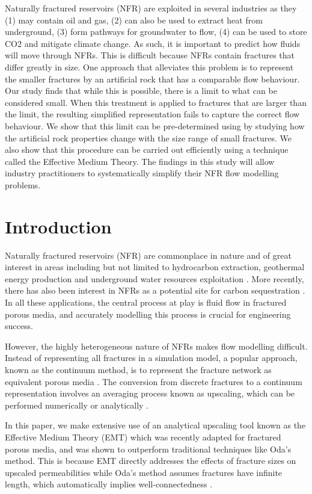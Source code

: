 \documentclass[a4paper]{article}
\begin{document}
Naturally fractured reservoirs (NFR) are exploited in several industries as they (1) may contain oil and gas, (2) can also be used to extract heat from underground, (3) form pathways for groundwater to flow, (4) can be used to store CO2 and mitigate climate change. As such, it is important to predict how fluids will move through NFRs. This is difficult because NFRs contain fractures that differ greatly in size. One approach that alleviates this problem is to represent the smaller fractures by an artificial rock that has a comparable flow behaviour. Our study finds that while this is possible, there is a limit to what can be considered small. When this treatment is applied to fractures that are larger than the limit, the resulting simplified representation fails to capture the correct flow behaviour. We show that this limit can be pre-determined using by studying how the artificial rock properties change with the size range of small fractures. We also show that this procedure can be carried out efficiently using a technique called the Effective Medium Theory. The findings in this study will allow industry practitioners to systematically simplify their NFR flow modelling problems.

\newpage
\section{Introduction}
Naturally fractured reservoirs (NFR) are commonplace in nature and of great interest in areas including but not limited to hydrocarbon extraction, geothermal energy production and underground water resources exploitation \citep{Berkowitz2002}. More recently, there has also been 
interest in NFRs as a potential site for carbon sequestration \citep{March2018}. In all these applications, the central process at play is fluid flow in fractured porous media, and accurately modelling this process is crucial for engineering success.

However, the highly heterogeneous nature of NFRs makes flow modelling difficult. Instead of representing all fractures in a simulation model, a popular approach, known as the continuum method, is to represent the fracture network as equivalent porous media \citep{Ezulike2013, Lemonnier2010a, Lemonnier2010, Warren1963, Yan2016}. The conversion from discrete fractures to a continuum representation involves an averaging process known as upscaling, which can be performed numerically or analytically \citep{Durlofsky1991,Oda1985,Renard1997,Saevik2013}. 

In this paper, we make extensive use of an analytical upscaling tool known as the Effective Medium Theory (EMT) which was recently adapted for fractured porous media, and was shown to outperform traditional techniques like Oda's method. This is because EMT directly addresses the effects of fracture sizes on upscaled permeabilities while Oda's method assumes fractures have infinite length, which automatically implies well-connectedness \citep{Oda1985, Saevik2013, Saevik2014}.
\end{document}
